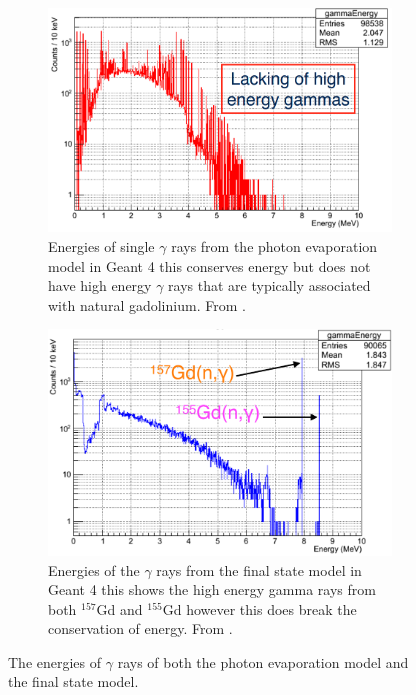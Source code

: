 \begin{figure}[H]
\centering
\begin{subfigure}{.5\textwidth}
  \centering
  \includegraphics[width=\linewidth]{Chapter4/Figs/Raster/gadolinium/photonEvaporationGd.png}
  \captionsetup{width=.9\linewidth}
  \caption{Energies of single $\gamma$ rays from the photon evaporation model in Geant 4 this conserves energy but does not have high energy $\gamma$ rays that are typically associated with natural gadolinium. From \cite{YuChen_2015}. }
  \label{subFig:differentGeant4Models_photonEvaporationGd}
\end{subfigure}%
\begin{subfigure}{.5\textwidth}
  \centering
  \includegraphics[width=\linewidth]{Chapter4/Figs/Raster/gadolinium/FinalStateGd.png}
  \captionsetup{width=.9\linewidth}
  \caption{Energies of the $\gamma$ rays from the final state model in Geant 4 this shows the high energy gamma rays from both $^{157}$Gd and $^{155}$Gd however this does break the conservation of energy. From \cite{YuChen_2015}. }
  \label{subFig:differentGeant4Models_finalStateGd}
\end{subfigure}
\caption{The energies of $\gamma$ rays of both the photon evaporation model and the final state model.}
\label{fig:differentGeant4Models}
\end{figure}

